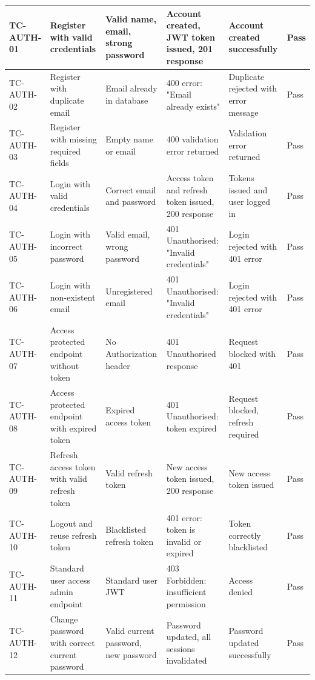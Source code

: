 \documentclass[12pt]{article}
\begin{document}
\begin{longtable}{|p{}|p{}|p{}|p{}|p{}|p{}|}
\hline
\textbf{TC-AUTH-01} & \textbf{Register with valid credentials} & \textbf{Valid name, email, strong password} & \textbf{Account created, JWT token issued, 201 response} & \textbf{Account created successfully} & \textbf{Pass} \\ \hline
\endhead
TC-AUTH-02 & Register with duplicate email & Email already in database & 400 error: "Email already exists" & Duplicate rejected with error message & Pass \\ \hline
TC-AUTH-03 & Register with missing required fields & Empty name or email & 400 validation error returned & Validation error returned & Pass \\ \hline
TC-AUTH-04 & Login with valid credentials & Correct email and password & Access token and refresh token issued, 200 response & Tokens issued and user logged in & Pass \\ \hline
TC-AUTH-05 & Login with incorrect password & Valid email, wrong password & 401 Unauthorised: "Invalid credentials" & Login rejected with 401 error & Pass \\ \hline
TC-AUTH-06 & Login with non-existent email & Unregistered email & 401 Unauthorised: "Invalid credentials" & Login rejected with 401 error & Pass \\ \hline
TC-AUTH-07 & Access protected endpoint without token & No Authorization header & 401 Unauthorised response & Request blocked with 401 & Pass \\ \hline
TC-AUTH-08 & Access protected endpoint with expired token & Expired access token & 401 Unauthorised: token expired & Request blocked, refresh required & Pass \\ \hline
TC-AUTH-09 & Refresh access token with valid refresh token & Valid refresh token & New access token issued, 200 response & New access token issued & Pass \\ \hline
TC-AUTH-10 & Logout and reuse refresh token & Blacklisted refresh token & 401 error: token is invalid or expired & Token correctly blacklisted & Pass \\ \hline
TC-AUTH-11 & Standard user access admin endpoint & Standard user JWT & 403 Forbidden: insufficient permission & Access denied & Pass \\ \hline
TC-AUTH-12 & Change password with correct current password & Valid current password, new password & Password updated, all sessions invalidated & Password updated successfully & Pass \\ \hline
\end{longtable}
\end{document}

